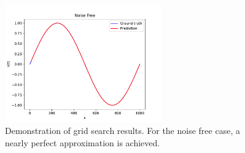 \begin{figure}
    \centering
    \includegraphics[width=0.6\textwidth]{figures/Noise_free.pdf}
    \caption{Demonstration of grid search results. For the noise free case,
    a nearly perfect approximation is achieved.}
    \label{fig:sinenoisefree}
\end{figure}

